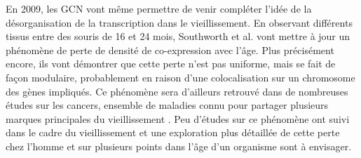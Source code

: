 En 2009, les GCN vont même permettre de venir compléter l'idée de la désorganisation de la transcription dans le vieillissement. En observant différents tissus entre des souris de 16 et 24 mois, Southworth et al. vont mettre à jour un phénomène de perte de densité de co-expression avec l'âge. Plus précisément encore, ils vont démontrer que cette perte n'est pas uniforme, mais se fait de façon modulaire, probablement en raison d'une colocalisation sur un chromosome des gènes impliqués. Ce phénomène sera d'ailleurs retrouvé dans de nombreuses études sur les cancers, ensemble de maladies connu pour partager plusieurs marques principales du vieillissement \cite{Anglani2014}. Peu d'études sur ce phénomène ont suivi dans le cadre du vieillissement et une exploration plus détaillée de cette perte chez l'homme et sur plusieurs points dans l'âge d'un organisme sont à envisager.






